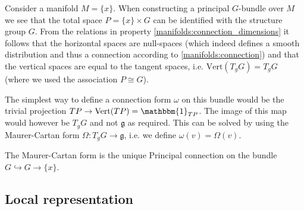 	
	\begin{construct}
		Consider a manifold $M = \{x\}$. When constructing a principal $G$-bundle over $M$ we see that the total space $P = \{x\}\times G$ can be identified with the structure group $G$. From the relations in property \ref{manifolds:connection_dimensions} it follows that the horizontal spaces are null-spaces (which indeed defines a smooth distribution and thus a connection according to \ref{manifolds:connection}) and that the vertical spaces are equal to the tangent spaces, i.e. $\text{Vert}(T_gG) = T_gG$ (where we used the association $P\cong G$).
		
		The simplest way to define a connection form $\omega$ on this bundle would be the trivial projection $TP\rightarrow\text{Vert}(TP) = \mathbbm{1}_{TP}$. The image of this map would however be $T_gG$ and not $\mathfrak{g}$ as required. This can be solved by using the Maurer-Cartan form $\Omega:T_gG\rightarrow\mathfrak{g}$, i.e. we define $\omega(v) = \Omega(v)$.
	\end{construct}
	
	\begin{property}
		The Maurer-Cartan form is the unique Principal connection on the bundle $G\hookrightarrow G\rightarrow \{x\}$.
	\end{property}

\subsection{Local representation}

	
